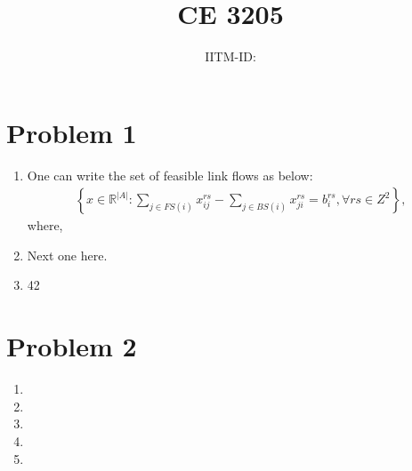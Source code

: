\documentclass{article}
\title{CE 3205 \exerciseset}
\author{\studentname \qquad IITM-ID: \suid}
\begin{document}
\maketitle

\section*{Problem 1}
\begin{enumerate}
\item %
One can write the set of feasible link flows as below:
\begin{eqnarray}
	\left\{x \in \mathbb{R}^{\vert A \vert} : \sum_{j \in FS(i)} x_{ij}^{rs}  - \sum_{j \in BS(i)}  x_{ji}^{rs} = b_{i}^{rs}, \forall rs \in Z^2\right\}, 
\end{eqnarray}
	where, 

\item %
Next one here.

\item %
42

\end{enumerate}

\section*{Problem 2}
\begin{enumerate}
\item %

\item %

\item %

\item %

\item %

\end{enumerate}
\end{document}
